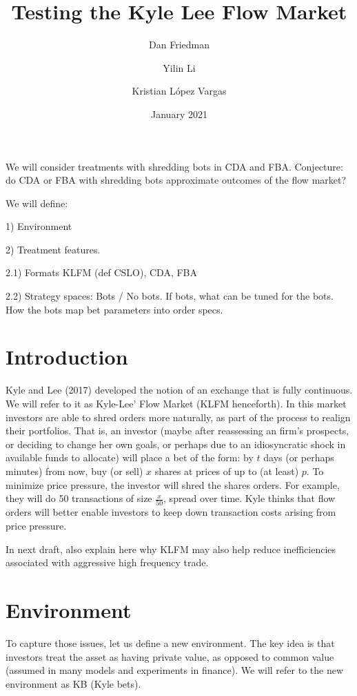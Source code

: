 \documentclass{article}
\title{Testing the Kyle Lee Flow Market}
\author{Dan Friedman \and Yilin Li \and Kristian López Vargas}
\date{January 2021}
\begin{document}
\maketitle
\tableofcontents
\newpage

We will consider treatments with shredding bots in CDA and FBA.
Conjecture: do CDA or FBA with shredding bots approximate outcomes of the flow market?

We will define:

1) Environment

2) Treatment features. 

2.1) Formats KLFM (def CSLO), CDA, FBA

2.2) Strategy spaces: Bots / No bots. 
If bots, what can be tuned for the bots.
How the bots map bet parameters into order specs. 




\section{Introduction}
Kyle and Lee (2017) developed the notion of an exchange that is fully continuous. We will refer to it as Kyle-Lee' Flow  Market (KLFM henceforth). In this market investors are able to shred orders more naturally, as part of the process to realign their portfolios. That is, an investor (maybe after reassessing an firm's prospects, or deciding to change her own goals, or perhaps due to an idiosyncratic shock in available funds to allocate) will place a bet of the form: by $t$ days (or perhaps minutes) from now, buy (or sell) $x$ shares at prices of up to (at least) $p$. 
To minimize price pressure, the investor will shred the shares orders. For example, they will do 50 transactions of size $\frac{x}{50}$, spread over time. Kyle thinks that flow orders will better enable investors to keep down transaction costs arising from price pressure.

In next draft, also explain here why KLFM may also help reduce inefficiencies associated with aggressive high frequency trade.

\section{Environment}
To capture those issues, let us define a new environment. The key idea is that investors treat the asset as having private value, as opposed to common value (assumed in many models and experiments in finance). We will refer to the new environment as KB (Kyle bets). %
\end{document}
